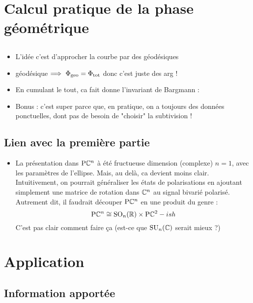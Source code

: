 
\section{Calcul pratique de la phase géométrique}

\subsection{}

\begin{itemize}
	\item L'idée c'est d'approcher la courbe par des géodésiques
	
	\item géodésique $\Longrightarrow\ \Phi_{\text{\normalfont geo}} = \Phi_{\text{\normalfont tot}}$ donc c'est juste des arg !
	
	\item En cumulant le tout, ca fait donne l'invariant de Bargmann :
	
	\item Bonus : c'est super parce que, en pratique, on a toujours des données ponctuelles, dont pas de besoin de "choisir" la subtivision !
\end{itemize}

\subsection{Lien avec la première partie}

\begin{itemize}
	\item La présentation dans $\text{\normalfont P}\mathbb{C}^{n}$ à été fructueuse dimension (complexe) $n=1$, avec les paramètres de l'ellipse. Mais, au delà, ca devient moins clair. Intuitivement, on pourrait généraliser les états de polarisations en ajoutant simplement une matrice de rotation dans $\mathbb{C}^n$ au signal bivarié polarisé. Autrement dit, il faudrait découper $\text{\normalfont P}\mathbb{C}^{n}$ en une produit du genre :
	\[\text{\normalfont P}\mathbb{C}^{n} \cong \text{\normalfont SO}_n(\mathbb{R})\times \text{\normalfont P}\mathbb{C}^{2}-ish\]
	C'est pas clair comment faire ça (est-ce que $\text{\normalfont SU}_n(\mathbb{C})$ serait mieux ?)
\end{itemize}



\section{Application}

\subsection{Information apportée}

